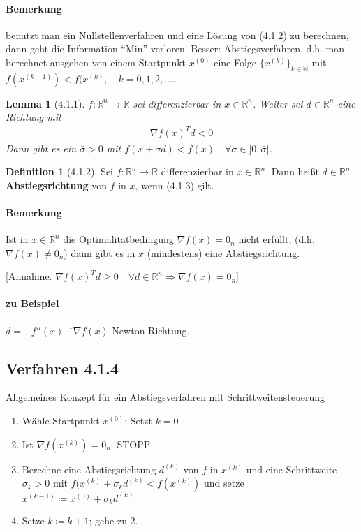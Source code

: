 \documentclass[ngerman,halfparskip]{scrartcl}
\newtheorem*{lemma}{Lemma}
\theoremstyle{definition}
\newtheorem*{defin}{Definition}
\newcommand*{\R}{\mathbb{R}}      %
\begin{document}
\paragraph{Bemerkung} benutzt man ein Nullstellenverfahren und eine Lösung von (4.1.2) zu berechnen, dann geht die Information "`Min"' verloren. Besser: Abstiegsverfahren, d.h. man berechnet ausgehen von einem Startpunkt $x^{(0)}$ eine Folge $\{x^{(k)}\}_{k\in\mathbb N}$ mit $f(x^{(k+1)})<f(x^{(k)}, \quad k=0,1,2,\ldots$.

\begin{lemma}[4.1.1] $f\colon \R^n\rightarrow \R$ sei differenzierbar in $x\in\R^n$. Weiter sei $d\in\R^n$ eine Richtung mit 
\begin{gather}
\tag{4.1.3} \nabla f(x)^Td<0
\end{gather}
Dann gibt es ein $\bar \sigma >0$ mit $f(x+\sigma d)< f(x) \quad \forall \sigma \in ]0,\bar \sigma]$.
\end{lemma}

\begin{defin}
[4.1.2] Sei $f\colon \R^n\rightarrow \R$ differenzierbar in $x\in\R^n$. Dann heißt $d\in\R^n$ \textbf{Abstiegsrichtung} von $f$ in $x$, wenn (4.1.3) gilt.
\end{defin}

\paragraph*{Bemerkung} Ist in $x\in\R^n$ die Optimalitätbedingung $\nabla f (x)=0_n$ nicht erfüllt, (d.h. $\nabla f(x)\neq 0_n$) dann gibt es in $x$ (mindestens) eine Abstiegsrichtung.

[Annahme. $\nabla f(x)^Td\geq 0\quad \forall d\in\R^n \Rightarrow \nabla f (x)=0_n$]

\paragraph*{zu Beispiel} $d=-f''(x)^{-1}\nabla f(x)$ Newton Richtung.

\subsection*{Verfahren 4.1.4} Allgemeines Konzept für ein Abstiegsverfahren mit Schrittweitensteuerung
\begin{enumerate}
\item Wähle Startpunkt $x^{(0)}$; Setzt $k=0$
\item Ist $\nabla f (x^{(k)})=0_n$. STOPP
\item Berechne eine Abstiegsrichtung $d^{(k)}$ von $f$ in $x^{(k)}$ und eine Schrittweite $\sigma_k>0$ mit $f(x^{(k)}+\sigma_kd^{(k)}<f(x^{(k)})$ und setze $x^{(k-1)}\coloneqq x^{(0)}+\sigma_kd^{(k)}$
\item Setze $k\coloneqq k+1$; gehe zu 2.
\end{enumerate}
\end{document}
